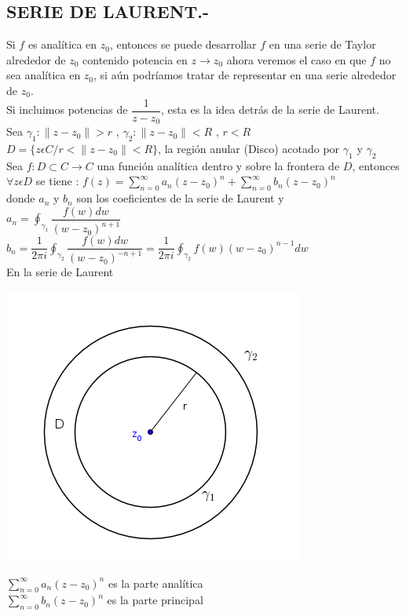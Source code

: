 \documentclass[10pt,a4paper]{article}
\begin{document}
\subsection{SERIE DE LAURENT.-}
Si $f$ es analítica en $z_0$, entonces se puede desarrollar $f$ en una serie de Taylor alrededor de $z_0$ contenido potencia en $\displaystyle{z \rightarrow z_0}$ ahora veremos el caso en que $f$ no sea analítica en $z_0$, si aún podríamos tratar de representar en una serie alrededor de $z_0$. \\
Si incluimos potencias de $\displaystyle{\dfrac{1}{z-z_0}}$, esta es la idea detrás de la serie de Laurent. \\
Sea $\displaystyle{\gamma_1 : \parallel z - z_0 \parallel > r}$ , $\displaystyle{\gamma_2 : \parallel z - z_0 \parallel < R}$ , $r < R$\\
$\displaystyle{D = \lbrace z \epsilon C / r < \parallel    z - z_0 \parallel < R \rbrace}$, la región anular (Disco) acotado por $\gamma_1$ y $\gamma_2$\\
Sea $\displaystyle{f: D \subset C \longrightarrow C}$ una función analítica dentro y sobre la frontera de $D$, entonces $\forall z \epsilon D$ se tiene : $\displaystyle{f(z) = \sum_{n = 0}^{\infty} a_n (z-z_0)^n + \sum_{n = 0}^{\infty} b_n (z-z_0)^n}$\\
donde $a_n$ y $b_n$ son los coeficientes de la serie de Laurent y $\displaystyle{a_n = \oint_{\gamma_1} \dfrac{f(w) dw}{(w-z_0)^{n+1}}}$ 
$\displaystyle{b_n = \dfrac{1}{2 \pi i} \oint_{\gamma_2} \dfrac{f(w) dw}{(w-z_0)^{-n+1}} = \dfrac{1}{2 \pi i} \oint_{\gamma_2} f(w) (w-z_0)^{n-1} dw}$ \\
En la serie de Laurent \\
\begin{center}
\includegraphics[scale=0.5]{4.png}
\end{center}
$\displaystyle{\sum_{n = 0}^{\infty} a_n (z-z_0)^n}$ es la parte analítica \\
$\displaystyle{\sum_{n = 0}^{\infty} b_n (z-z_0)^n}$ es la parte principal \\
\end{document}
